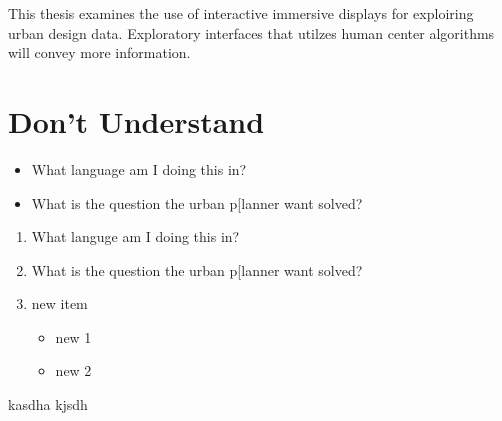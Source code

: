 
This thesis examines the use of interactive immersive displays for exploiring urban design data. Exploratory interfaces that utilzes human center algorithms will convey more information.

\section{Don't Understand}

\begin{itemize}
\item What language am I doing this in?
\item What is the question the urban p[lanner want solved?
\end{itemize}
 
\begin{enumerate}
\item What languge am I doing this in?
\item What is the question the urban p[lanner want solved?
\item new item
\begin{itemize}
\item new 1
\item new 2
\end{itemize}
\end{enumerate}

kasdha kjsdh

